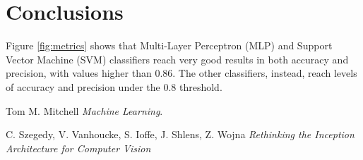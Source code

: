 \documentclass[12pt]{article}
\begin{document}
\section{Conclusions}
Figure \ref{fig:metrics} shows that Multi-Layer Perceptron (MLP) and Support Vector Machine (SVM) classifiers reach very good results in both accuracy and precision, with values higher than 0.86. The other classifiers, instead, reach levels of accuracy and precision under the 0.8 threshold.

\newpage
\begin{thebibliography}{10}
	
	Tom M. Mitchell \textsl{Machine Learning}.
	
	C. Szegedy, V. Vanhoucke, S. Ioffe, J. Shlens, Z. Wojna
	\textsl{Rethinking the Inception Architecture for Computer Vision}
	
\end{thebibliography}
\end{document}
